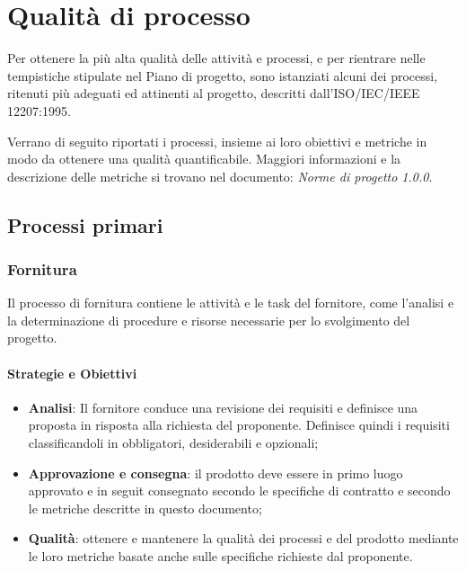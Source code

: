 \section{Qualità di processo}
Per ottenere la più alta qualità delle attività e processi, e per rientrare nelle tempistiche stipulate nel Piano di progetto, sono istanziati alcuni dei processi, ritenuti più adeguati ed attinenti al progetto, descritti dall'ISO/IEC/IEEE 12207:1995.

Verrano di seguito riportati i processi, insieme ai loro obiettivi e metriche in modo da ottenere una qualità quantificabile. Maggiori informazioni e la descrizione delle metriche si trovano nel documento: \textit{Norme di progetto 1.0.0}.

    \subsection{Processi primari}
    
    
        \subsubsection{Fornitura}
        Il processo di fornitura contiene le attività e le task del fornitore, come l'analisi e la determinazione di procedure e risorse necessarie per lo svolgimento del progetto.
        
            \paragraph{Strategie e Obiettivi}
            \begin{itemize}
                \item \textbf{Analisi}: Il fornitore conduce una revisione dei requisiti e definisce una proposta in risposta alla richiesta del proponente. Definisce quindi i requisiti classificandoli in obbligatori, desiderabili e opzionali;
                \item \textbf{Approvazione e consegna}: il prodotto deve essere in primo luogo approvato e in seguit consegnato secondo le specifiche di contratto e secondo le metriche descritte in questo documento;
                \item \textbf{Qualità}: ottenere e mantenere la qualità dei processi e del prodotto mediante le loro metriche basate anche sulle specifiche richieste dal proponente.
            \end{itemize}
            
            

